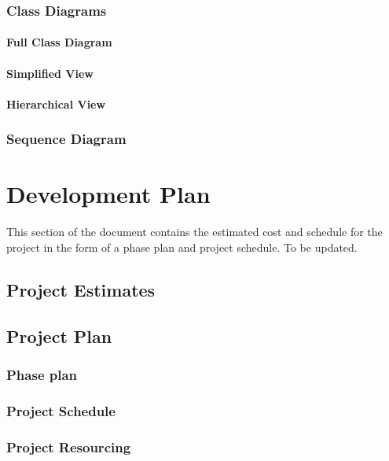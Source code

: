 \documentclass[10pt, a4paper]{article}
\begin{document}
		\subsubsection{Class Diagrams}
		
			\paragraph{Full Class Diagram}
			
			\paragraph{Simplified View}
			
			\paragraph{Hierarchical View}
			
		\subsubsection{Sequence Diagram}
		
\section{Development Plan}

This section of the document contains the estimated cost and schedule for the project in the form of a phase plan and project schedule. To be updated. \\
	\subsection{Project Estimates}
	
	\subsection{Project Plan}
	
		\subsubsection{Phase plan}
		\subsubsection{Project Schedule}
		\subsubsection{Project Resourcing}
	
	
\end{document}
